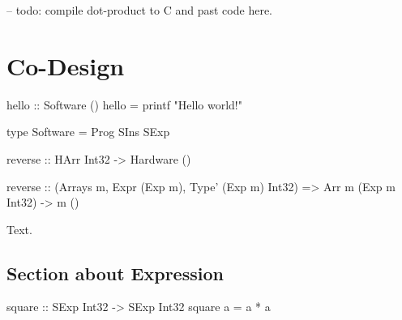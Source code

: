 \begin{code}
-- todo: compile dot-product to C and past code here.
\end{code}


\section{Co-Design}

\lipsum[1]

\begin{code}
hello :: Software ()
hello = printf "Hello world!\n"
\end{code}

\lipsum[2]

\begin{code}
type Software = Prog SIns SExp
\end{code}

\lipsum[3]


\lipsum[4]

\begin{stub}
reverse :: HArr Int32 -> Hardware ()
\end{stub}

\lipsum[5]

\begin{stub}
reverse :: (Arrays m, Expr (Exp m), Type' (Exp m) Int32) =>
  Arr m (Exp m Int32) -> m ()
\end{stub}

Text.

\subsection{Section about Expression}

\lipsum[1]

\begin{code}
square :: SExp Int32 -> SExp Int32
square a = a * a
\end{code}

\lipsum[1]


